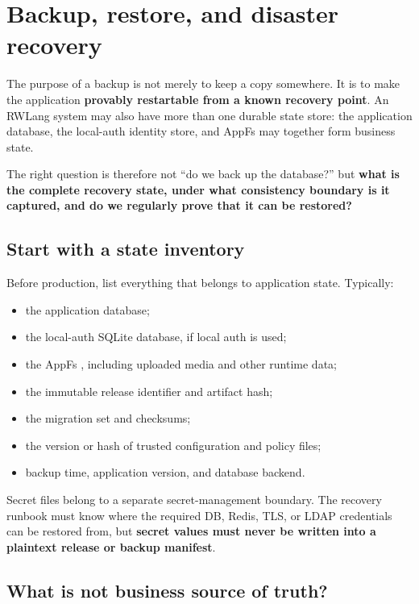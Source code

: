 \chapter{Backup, restore, and disaster recovery}\label{ch:recovery}

The purpose of a backup is not merely to keep a copy somewhere. It is to make the application \textbf{provably restartable from a known recovery point}. An RWLang system may also have more than one durable state store: the application database, the local-auth identity store, and AppFs may together form business state.

The right question is therefore not ``do we back up the database?'' but \textbf{what is the complete recovery state, under what consistency boundary is it captured, and do we regularly prove that it can be restored?}

\section{Start with a state inventory}

Before production, list everything that belongs to application state. Typically:

\begin{itemize}
  \item the application database;
  \item the local-auth SQLite database, if local auth is used;
  \item the AppFs , including uploaded media and other runtime data;
  \item the immutable release identifier and artifact hash;
  \item the migration set and checksums;
  \item the version or hash of trusted configuration and policy files;
  \item backup time, application version, and database backend.
\end{itemize}

Secret files belong to a separate secret-management boundary. The recovery runbook must know where the required DB, Redis, TLS, or LDAP credentials can be restored from, but \textbf{secret values must never be written into a plaintext release or backup manifest}.

\section{What is not business source of truth?}

